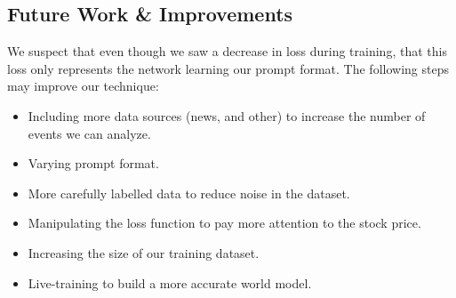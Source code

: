 \documentclass[conference]{IEEEtran}
\begin{document}
\subsection{Future Work \& Improvements}
We suspect that even though we saw a decrease in loss during training, that this loss only represents the network learning our prompt format. The following steps may improve our technique:
\begin{itemize}
    \item Including more data sources (news, and other) to increase the number of events we can analyze.
    \item Varying prompt format.
    \item More carefully labelled data to reduce noise in the dataset.
    \item Manipulating the loss function to pay more attention to the stock price.
    \item Increasing the size of our training dataset.
    \item Live-training to build a more accurate world model.
\end{itemize}
\end{document}

